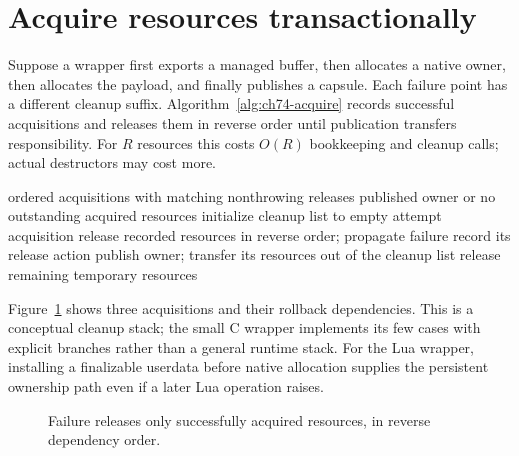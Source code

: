\section{Acquire resources transactionally}
\label{sec:ch74-cleanup}
Suppose a wrapper first exports a managed buffer, then allocates a native owner, then allocates the payload, and finally publishes a capsule.
Each failure point has a different cleanup suffix.
Algorithm~\ref{alg:ch74-acquire} records successful acquisitions and releases them in reverse order until publication transfers responsibility.
For $R$ resources this costs $O(R)$ bookkeeping and cleanup calls; actual destructors may cost more.

\begin{algorithm}[htbp]
\caption{Acquire and publish an owned result with complete failure cleanup.}
\label{alg:ch74-acquire}
\begin{pseudocode}
\Require ordered acquisitions with matching nonthrowing releases
\Ensure published owner or no outstanding acquired resources
\State initialize cleanup list to empty
  \State attempt acquisition
    \State release recorded resources in reverse order; propagate failure
  \EndIf
  \State record its release action
\EndFor
\State publish owner; transfer its resources out of the cleanup list
\State release remaining temporary resources
\end{pseudocode}
\end{algorithm}

Figure~\ref{fig:ch74-cleanup} shows three acquisitions and their rollback dependencies.
This is a conceptual cleanup stack; the small C wrapper implements its few cases with explicit branches rather than a general runtime stack.
For the Lua wrapper, installing a finalizable userdata before native allocation supplies the persistent ownership path even if a later Lua operation raises.

\begin{figure}[htbp]
\centering
{}
\caption{Failure releases only successfully acquired resources, in reverse dependency order.}
\label{fig:ch74-cleanup}
\end{figure}

